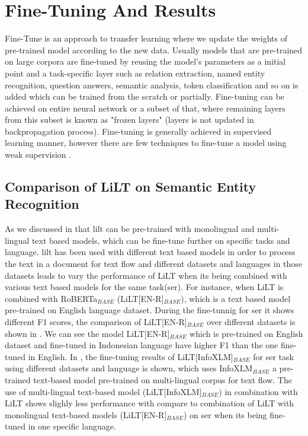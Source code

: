 
\chapter{Fine-Tuning And Results \label{Chapter_Evaluation}}

Fine-Tune is an approach to transfer learning where we update the weights of pre-trained model according to the new data. Usually models that are pre-trained on large corpora are fine-tuned by reusing the model's parameters as a initial point and a task-specific layer such as relation extraction, named entity recognition, question answers, semantic analysis, token classification and so on is added which can be trained from the scratch or partially. Fine-tuning can be achieved on entire neural network or a subset of that, where remaining layers from this subset is known as "frozen layers" (layers is not updated in backpropagation process). Fine-tuning is generally achieved in supervised learning manner, however there are few techniques to fine-tune a model using weak supervision \cite{yu2020fine}.

\section{Comparison of LiLT on Semantic Entity Recognition}
 As we discussed in  that \acrshort{lilt} can be pre-trained with monolingual and multi-lingual text based models, which can be fine-tune further on specific tasks and language. \acrshort{lilt} has been used with different text based models in order to process the text in a document for text flow and different datasets and languages in those datasets leads to vary the performance of LiLT when its being combined with various text based models for the same task(\acrshort{ser}). For instance, when LiLT is combined with RoBERTa\(_{BASE}\) (LiLT[EN-R]\(_{BASE}\)), which is a text based model pre-trained on English language dataset. During the fine-tunnig for \acrfull{ser} it shows different F1 scores, the comparison of LiLT[EN-R]\(_{BASE}\) over different datasets is shown in . We can see the model LiLT[EN-R]\(_{BASE}\) which is pre-trained on English dataset and fine-tuned in Indonesian language have higher F1 than the one fine-tuned in English. In , the fine-tuning results of LiLT[InfoXLM]\(_{BASE}\) for \acrshort{ser} task using different datasets and language is shown,  which uses InfoXLM\(_{BASE}\) a pre-trained text-based model pre-trained on multi-lingual corpus for text flow.  The use of multi-lingual text-based model (LiLT[InfoXLM]\(_{BASE}\)) in combination with LiLT shows slighly less performance with compare to combination of LiLT with monolingual text-based models (LiLT[EN-R]\(_{BASE}\)) on \acrshort{ser} when its being fine-tuned in one specific language. 

